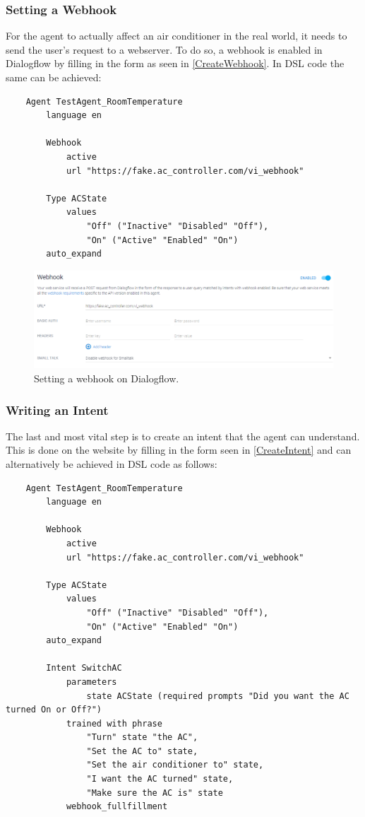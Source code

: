 \subsubsection{Setting a Webhook}
For the agent to actually affect an air conditioner in the real world, it needs to send the user's request to a webserver. To do so, a webhook is enabled in Dialogflow by filling in the form as seen in \autoref{CreateWebhook}.
In DSL code the same can be achieved:
\begin{verbatim}
    Agent TestAgent_RoomTemperature
        language en 
            
        Webhook 
            active 
            url "https://fake.ac_controller.com/vi_webhook"

        Type ACState
            values 
                "Off" ("Inactive" "Disabled" "Off"),
                "On" ("Active" "Enabled" "On")
        auto_expand
\end{verbatim}

\begin{figure}[ht]
    \centering
    \includegraphics[width=1\textwidth]{Thesis Images/CreateWebhook.PNG}
    \caption{Setting a webhook on Dialogflow.}
        \label{CreateWebhook}
\end{figure}

\subsubsection{Writing an Intent}
The last and most vital step is to create an intent that the agent can understand. This is done on the website by filling in the form seen in \autoref{CreateIntent} and can alternatively be achieved in DSL code as follows:
\begin{verbatim}
    Agent TestAgent_RoomTemperature
        language en 
            
        Webhook 
            active 
            url "https://fake.ac_controller.com/vi_webhook"

        Type ACState
            values 
                "Off" ("Inactive" "Disabled" "Off"),
                "On" ("Active" "Enabled" "On")
        auto_expand

        Intent SwitchAC
            parameters
                state ACState (required prompts "Did you want the AC turned On or Off?")
            trained with phrase
                "Turn" state "the AC",
                "Set the AC to" state,
                "Set the air conditioner to" state,
                "I want the AC turned" state,
                "Make sure the AC is" state
            webhook_fullfillment
\end{verbatim}

